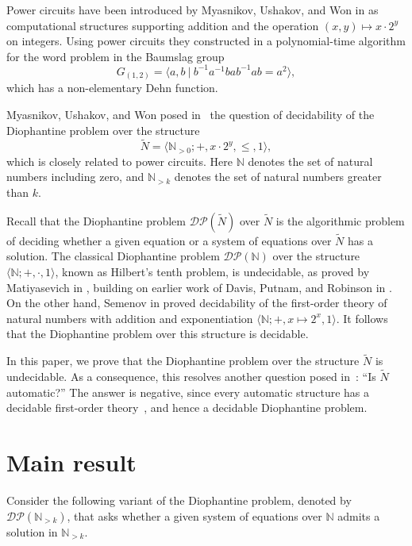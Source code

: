 \documentclass{jgcc} %
\theoremstyle{plain}\newtheorem{satz}[thm]{Satz} %
\begin{document}
Power circuits have been introduced by Myasnikov, Ushakov, and Won in \cite{MUW2} 
as computational structures supporting addition and the operation
$(x,y) \mapsto x \cdot 2^y$ on integers.
Using power circuits they constructed in \cite{MUW1} a polynomial-time algorithm for the word
problem in the Baumslag group
$$
G_{(1,2)} = \langle a,b\ |\ b^{-1} a^{-1} ba b^{-1} ab = a^2 \rangle,
$$
which has a non-elementary Dehn function.

Myasnikov, Ushakov, and Won posed in~\cite[Problem~10.3]{MUW2} the question
of decidability of the Diophantine problem over the structure
$$
\widetilde{N} = \langle \mathbb{N}_{>0}; +, x \cdot 2^y, \leq, 1 \rangle,
$$
which is closely related to power circuits. 
Here $\mathbb{N}$ denotes the set
of natural numbers including zero, and $\mathbb{N}_{>k}$ denotes the set of
natural numbers greater than $k$.

Recall that the Diophantine problem $\mathcal{DP}(\widetilde{N})$ over $\widetilde{N}$ is the algorithmic problem of deciding whether
a given equation or a system of equations over $\widetilde{N}$ has a solution.
The classical Diophantine problem $\mathcal{DP}(\mathbb{N})$ over the structure $\langle \mathbb{N}; +, \cdot, 1 \rangle$, known as 
Hilbert's tenth problem, is undecidable, as proved by Matiyasevich in \cite{Mat},
building on earlier work of Davis, Putnam, and Robinson in \cite{DPR}.
On the other hand, Semenov in \cite{Sem} proved decidability of the first-order
theory of natural numbers with addition and exponentiation $\langle \mathbb{N}; +, x \mapsto 2^x, 1 \rangle$. It follows that the Diophantine problem over this structure is decidable.

In this paper, we prove that the Diophantine problem over the structure
$\widetilde{N}$ is undecidable. As a consequence, this resolves
another question posed in~\cite[Problem~10.5]{MUW2}: ``Is $\widetilde{N}$ automatic?'' The answer is negative, since every
automatic structure has a decidable first-order theory~\cite{KN}, and hence a decidable Diophantine problem.


\section{Main result}

Consider the following variant of the Diophantine problem, denoted by
$\mathcal{DP}(\mathbb{N}_{>k})$, that  asks whether a given system of
equations over $\mathbb{N}$ admits a solution in $\mathbb{N}_{>k}$.
\end{document}
